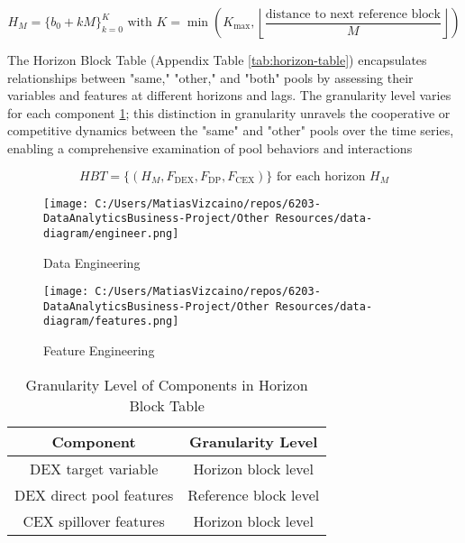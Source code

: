 \documentclass{article}
\begin{document}
\begin{equation}
H_{M} = \{b_{0}+kM\}_{k=0}^{K} \text{ with } K = \min \left( K_{\text{max}}, \left\lfloor \frac{\text{distance to next reference block}}{M} \right\rfloor \right)
\end{equation}

The Horizon Block Table (Appendix Table \ref{tab:horizon-table}) encapsulates relationships between "same," "other," and "both" pools by assessing their variables and features at different horizons and lags. The granularity level varies for each component  \ref{tab:granularity}; this distinction in granularity unravels the cooperative or competitive dynamics between the "same" and "other" pools over the time series, enabling a comprehensive examination of pool behaviors and interactions

\begin{equation}
  HBT = \{ (H_{M}, F_{\text{DEX}}, F_{\text{DP}}, F_{\text{CEX}}) \} \text{ for each horizon } H_{M} 
  \end{equation}

\begin{figure}[htbp]
  \begin{minipage}{0.5\textwidth}
  \centering
  \texttt{[image: C:/Users/MatiasVizcaino/repos/6203-DataAnalyticsBusiness-Project/Other Resources/data-diagram/engineer.png]}
  \caption{Data Engineering}
  \label{fig:data-diagram-engineer}
  \end{minipage}
  \begin{minipage}{0.45\textwidth}
  \centering
  \texttt{[image: C:/Users/MatiasVizcaino/repos/6203-DataAnalyticsBusiness-Project/Other Resources/data-diagram/features.png]}
  \caption{Feature Engineering}
  \label{fig:data-diagram-features}
  \end{minipage}
\end{figure}

  
  
\begin{table}[htbp]
\centering
\begin{tabular}{|c|c|}
\hline
\textbf{Component} & \textbf{Granularity Level} \\
\hline
DEX target variable & Horizon block level \\
\hline
DEX direct pool features & Reference block level \\
\hline
CEX spillover features & Horizon block level \\
\hline
\end{tabular}
\caption{Granularity Level of Components in Horizon Block Table}
\label{tab:granularity}
\end{table}
\end{document}
